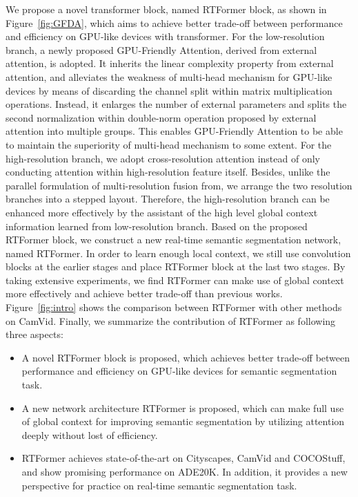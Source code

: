 \documentclass{article}
\begin{document}
We propose a novel transformer block, named RTFormer block, as shown in Figure~\ref{fig:GFDA}, which aims to achieve better trade-off between performance and efficiency on GPU-like devices with transformer. For the low-resolution branch, a newly proposed GPU-Friendly Attention, derived from external attention\cite{guo2021beyond}, is adopted. It inherits the linear complexity property from external attention, and alleviates the weakness of multi-head mechanism for GPU-like devices by means of discarding the channel split within matrix multiplication operations. Instead, it enlarges the number of external parameters and splits the second normalization within double-norm operation proposed by external attention into multiple groups. This enables GPU-Friendly Attention to be able to maintain the superiority of multi-head mechanism to some extent. For the high-resolution branch, we adopt cross-resolution attention instead of only conducting attention within high-resolution feature itself. Besides, unlike the parallel formulation of multi-resolution fusion from\cite{wang2020deep, hong2021deep, yuan2021hrformer}, we arrange the two resolution branches into a stepped layout. Therefore, the high-resolution branch can be enhanced more effectively by the assistant of the high level global context information learned from low-resolution branch. Based on the proposed RTFormer block, we construct a new real-time semantic segmentation network, named RTFormer. In order to learn enough local context, we still use convolution blocks at the earlier stages and place RTFormer block at the last two stages. By taking extensive experiments, we find RTFormer can make use of global context more effectively and achieve better trade-off than previous works. Figure~\ref{fig:intro} shows the comparison between RTFormer with other methods on CamVid. Finally, we summarize the contribution of RTFormer as following three aspects:
\begin{itemize}
\item A novel RTFormer block is proposed, which achieves better trade-off between performance and efficiency on GPU-like devices for semantic segmentation task.
\item A new network architecture RTFormer is proposed, which can make full use of global context for improving semantic segmentation by utilizing attention deeply without lost of efficiency.
\item RTFormer achieves state-of-the-art on Cityscapes, CamVid and COCOStuff, and show promising performance on ADE20K. In addition, it provides a new perspective for practice on real-time semantic segmentation task.
\end{itemize}
\end{document}
